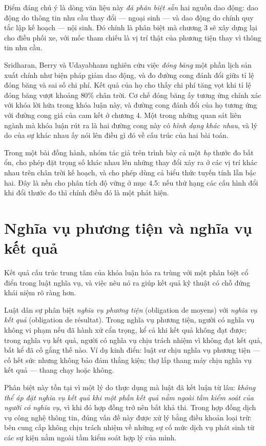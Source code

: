Điểm đáng chú ý là dòng văn liệu này \emph{đã phân biệt sẵn} hai nguồn dao động: dao động do
thông tin nhu cầu thay đổi --- ngoại sinh --- và dao động do chính quy tắc lập kế hoạch ---
nội sinh. Đó chính là phân biệt mà chương 3 sẽ xây dựng lại cho điều phối xe, với mốc tham
chiếu là vị trí thật của phương tiện thay vì thông tin nhu cầu.

Sridharan, Berry và Udayabhanu \cite{sridharan1987} nghiên cứu việc \emph{đóng băng} một phần
lịch sản xuất chính như biện pháp giảm dao động, và đo đường cong đánh đổi giữa tỉ lệ đóng băng
và sai số chi phí. Kết quả của họ cho thấy chi phí tăng vọt khi tỉ lệ đóng băng vượt khoảng
$80\%$ chân trời. Cơ chế đóng băng ấy tương ứng chính xác với khóa lời hứa trong khóa luận này,
và đường cong đánh đổi của họ tương ứng với đường cong giá của cam kết ở chương 4. Một trong
những quan sát liên ngành mà khóa luận rút ra là hai đường cong này có \emph{hình dạng khác
nhau}, và lý do của sự khác nhau ấy nói lên điều gì đó về cấu trúc của hai bài toán.

Trong một bài đồng hành, nhóm tác giả trên trình bày cả một \emph{họ} thước đo bất ổn, cho phép
đặt trọng số khác nhau lên những thay đổi xảy ra ở các vị trí khác nhau trên chân trời kế hoạch,
và cho phép dùng cả biểu thức tuyến tính lẫn bậc hai. Đây là nền cho phân tích độ vững ở mục
4.5: nếu thứ hạng các cấu hình đổi khi đổi thước đo thì chính điều đó là một phát hiện.

\section{Nghĩa vụ phương tiện và nghĩa vụ kết quả}

Kết quả cấu trúc trung tâm của khóa luận hóa ra trùng với một phân biệt cổ điển trong luật
nghĩa vụ, và việc nêu nó ra giúp kết quả kỹ thuật có chỗ đứng khái niệm rõ ràng hơn.

Luật dân sự phân biệt \emph{nghĩa vụ phương tiện} (obligation de moyens) với \emph{nghĩa vụ kết
quả} (obligation de résultat). Trong nghĩa vụ phương tiện, người có nghĩa vụ không vi phạm nếu
đã hành xử cẩn trọng, kể cả khi kết quả không đạt được; trong nghĩa vụ kết quả, người có nghĩa
vụ chịu trách nhiệm vì không đạt kết quả, bất kể đã cố gắng thế nào. Ví dụ kinh điển: luật sư
chịu nghĩa vụ phương tiện --- cố hết sức nhưng không bảo đảm thắng kiện; thợ lắp thang máy chịu
nghĩa vụ kết quả --- thang chạy hoặc không.

Phân biệt này tồn tại vì một lý do thực dụng mà luật đã kết luận từ lâu: \emph{không thể áp đặt
nghĩa vụ kết quả khi một phần kết quả nằm ngoài tầm kiểm soát của người có nghĩa vụ}, vì khi đó
hợp đồng trở nên bất khả thi. Trong hợp đồng dịch vụ công nghệ thông tin, đúng vấn đề này được
xử lý bằng điều khoản loại trừ: bên cung cấp không chịu trách nhiệm về những sự cố mức dịch vụ
phát sinh từ các sự kiện nằm ngoài tầm kiểm soát hợp lý của mình.

